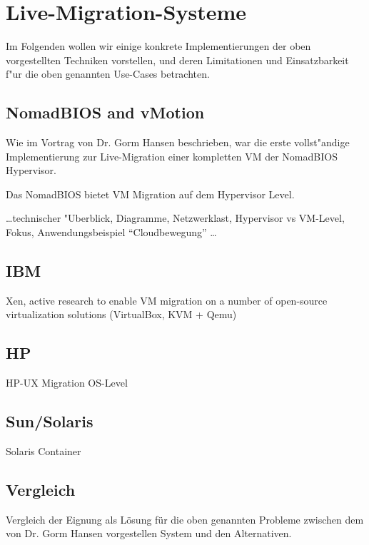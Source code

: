 \section{Live-Migration-Systeme}
Im Folgenden wollen wir einige konkrete Implementierungen der oben
vorgestellten Techniken vorstellen, und deren Limitationen und
Einsatzbarkeit f"ur die oben genannten Use-Cases betrachten.

\subsection{NomadBIOS and vMotion}
\label{sec:nomadbios--vmware}
Wie im Vortrag von Dr. Gorm Hansen beschrieben, war die erste
vollst"andige Implementierung zur Live-Migration einer kompletten VM
der NomadBIOS Hypervisor.

Das NomadBIOS bietet VM Migration auf dem Hypervisor Level.

\ldots technischer "Uberblick, Diagramme, Netzwerklast, Hypervisor vs
VM-Level, Fokus, Anwendungsbeispiel "`Cloudbewegung"' \ldots

\subsection{IBM}
Xen, active research to enable VM migration on a number of open-source
virtualization solutions (VirtualBox, KVM + Qemu)

\subsection{HP}
HP-UX Migration
OS-Level

\subsection{Sun/Solaris}
Solaris Container

\subsection{Vergleich}
Vergleich der Eignung als Lösung für die oben genannten Probleme
zwischen dem von Dr. Gorm Hansen vorgestellen System und den Alternativen.


